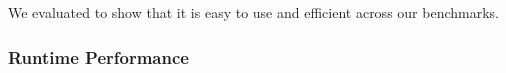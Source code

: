 We evaluated \sys to show that it is easy to use and efficient across our
benchmarks. %

%


\subsubsection{\sys Runtime Performance}
\label{sec:result_coalescing}

